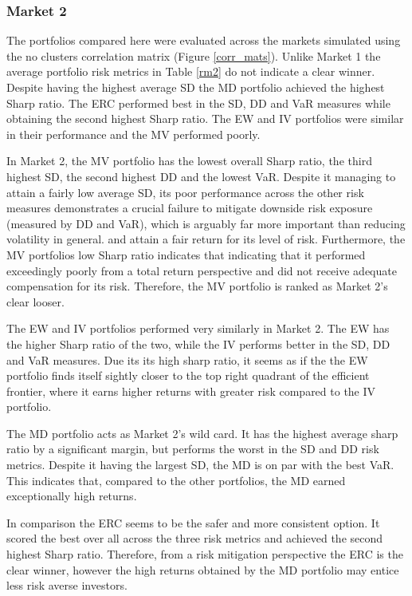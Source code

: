 \documentclass[11pt,preprint, authoryear]{elsarticle}
\numberwithin{equation}{section}
\numberwithin{figure}{section}
\numberwithin{table}{section}
\begin{document}
\hypertarget{market-2}{%
\subsubsection{Market 2}\label{market-2}}

The portfolios compared here were evaluated across the markets simulated
using the no clusters correlation matrix (Figure \ref{corr_mats}).
Unlike Market 1 the average portfolio risk metrics in Table \ref{rm2} do
not indicate a clear winner. Despite having the highest average SD the
MD portfolio achieved the highest Sharp ratio. The ERC performed best in
the SD, DD and VaR measures while obtaining the second highest Sharp
ratio. The EW and IV portfolios were similar in their performance and
the MV performed poorly.

In Market 2, the MV portfolio has the lowest overall Sharp ratio, the
third highest SD, the second highest DD and the lowest VaR. Despite it
managing to attain a fairly low average SD, its poor performance across
the other risk measures demonstrates a crucial failure to mitigate
downside risk exposure (measured by DD and VaR), which is arguably far
more important than reducing volatility in general. and attain a fair
return for its level of risk. Furthermore, the MV portfolios low Sharp
ratio indicates that indicating that it performed exceedingly poorly
from a total return perspective and did not receive adequate
compensation for its risk. Therefore, the MV portfolio is ranked as
Market 2's clear looser.

The EW and IV portfolios performed very similarly in Market 2. The EW
has the higher Sharp ratio of the two, while the IV performs better in
the SD, DD and VaR measures. Due its its high sharp ratio, it seems as
if the the EW portfolio finds itself sightly closer to the top right
quadrant of the efficient frontier, where it earns higher returns with
greater risk compared to the IV portfolio.

The MD portfolio acts as Market 2's wild card. It has the highest
average sharp ratio by a significant margin, but performs the worst in
the SD and DD risk metrics. Despite it having the largest SD, the MD is
on par with the best VaR. This indicates that, compared to the other
portfolios, the MD earned exceptionally high returns.

In comparison the ERC seems to be the safer and more consistent option.
It scored the best over all across the three risk metrics and achieved
the second highest Sharp ratio. Therefore, from a risk mitigation
perspective the ERC is the clear winner, however the high returns
obtained by the MD portfolio may entice less risk averse investors.
\end{document}
